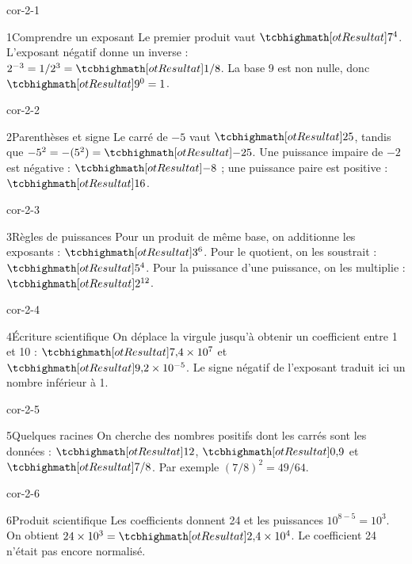 \clearpage\pagestyle{otMain}\fontsize{11}{15}\selectfont{}
\begin{blocLivre}{cor-2-1}\begin{corrige}{1}{Comprendre un exposant}
Le premier produit vaut $\res{7^4}$. L’exposant négatif donne un inverse : $2^{-3}=1/2^3=\res{1/8}$. La base 9 est non nulle, donc $\res{9^0=1}$.
\end{corrige}\end{blocLivre}
\begin{blocLivre}{cor-2-2}\begin{corrige}{2}{Parenthèses et signe}
Le carré de $-5$ vaut $\res{25}$, tandis que $-5^2=-(5^2)=\res{-25}$. Une puissance impaire de $-2$ est négative : $\res{-8}$ ; une puissance paire est positive : $\res{16}$.
\end{corrige}\end{blocLivre}
\begin{blocLivre}{cor-2-3}\begin{corrige}{3}{Règles de puissances}
Pour un produit de même base, on additionne les exposants : $\res{3^6}$. Pour le quotient, on les soustrait : $\res{5^4}$. Pour la puissance d’une puissance, on les multiplie : $\res{2^{12}}$.
\end{corrige}\end{blocLivre}
\begin{blocLivre}{cor-2-4}\begin{corrige}{4}{Écriture scientifique}
On déplace la virgule jusqu’à obtenir un coefficient entre 1 et 10 : $\res{7{,}4\times10^7}$ et $\res{9{,}2\times10^{-5}}$. Le signe négatif de l’exposant traduit ici un nombre inférieur à 1.
\end{corrige}\end{blocLivre}
\begin{blocLivre}{cor-2-5}\begin{corrige}{5}{Quelques racines}
On cherche des nombres positifs dont les carrés sont les données : $\res{12}$, $\res{0{,}9}$ et $\res{7/8}$. Par exemple $(7/8)^2=49/64$.
\end{corrige}\end{blocLivre}
\begin{blocLivre}{cor-2-6}\begin{corrige}{6}{Produit scientifique}
Les coefficients donnent 24 et les puissances $10^{8-5}=10^3$. On obtient $24\times10^3=\res{2{,}4\times10^4}$. Le coefficient 24 n’était pas encore normalisé.
\end{corrige}\end{blocLivre}
